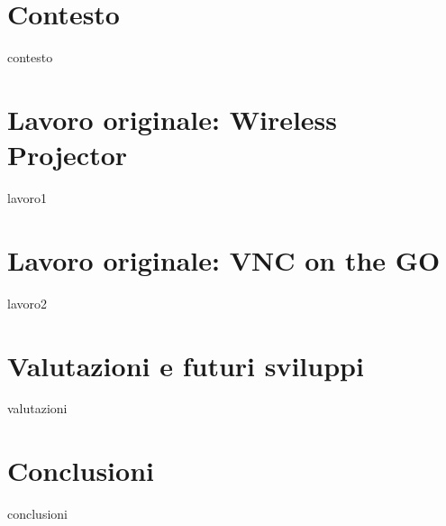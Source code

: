 \documentclass[12pt,a4paper,openright,twoside]{report}
\begin{document}
\chapter{Contesto} %
\lhead[\fancyplain{}{\bfseries\thepage}]{\fancyplain{}{\bfseries\rightmark}}

{contesto} 

\clearpage{\pagestyle{empty}\cleardoublepage} %

\chapter{Lavoro originale: Wireless Projector}

{lavoro1}

\chapter{Lavoro originale: VNC on the GO}

{lavoro2}
\chapter{Valutazioni e futuri sviluppi}

{valutazioni}

\chapter*{Conclusioni}
{conclusioni}
\end{document}

